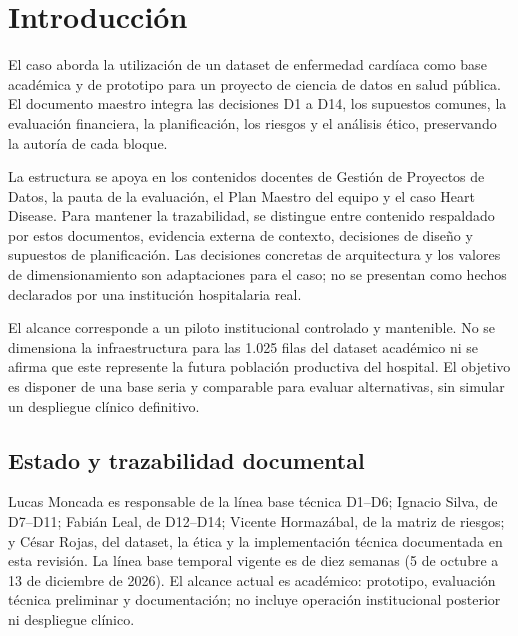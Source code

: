 \section{Introducción}

El caso aborda la utilización de un dataset de enfermedad cardíaca como base académica y de prototipo para un proyecto de ciencia de datos en salud pública. El documento maestro integra las decisiones D1 a D14, los supuestos comunes, la evaluación financiera, la planificación, los riesgos y el análisis ético, preservando la autoría de cada bloque.

La estructura se apoya en los contenidos docentes de Gestión de Proyectos de Datos, la pauta de la evaluación, el Plan Maestro del equipo y el caso Heart Disease. Para mantener la trazabilidad, se distingue entre contenido respaldado por estos documentos, evidencia externa de contexto, decisiones de diseño y supuestos de planificación. Las decisiones concretas de arquitectura y los valores de dimensionamiento son adaptaciones para el caso; no se presentan como hechos declarados por una institución hospitalaria real.

El alcance corresponde a un piloto institucional controlado y mantenible. No se dimensiona la infraestructura para las 1.025 filas del dataset académico ni se afirma que este represente la futura población productiva del hospital. El objetivo es disponer de una base seria y comparable para evaluar alternativas, sin simular un despliegue clínico definitivo.

\subsection{Estado y trazabilidad documental}

Lucas Moncada es responsable de la línea base técnica D1--D6; Ignacio Silva, de D7--D11; Fabián Leal, de D12--D14; Vicente Hormazábal, de la matriz de riesgos; y César Rojas, del dataset, la ética y la implementación técnica documentada en esta revisión. La línea base temporal vigente es de diez semanas (5 de octubre a 13 de diciembre de 2026). El alcance actual es académico: prototipo, evaluación técnica preliminar y documentación; no incluye operación institucional posterior ni despliegue clínico.

